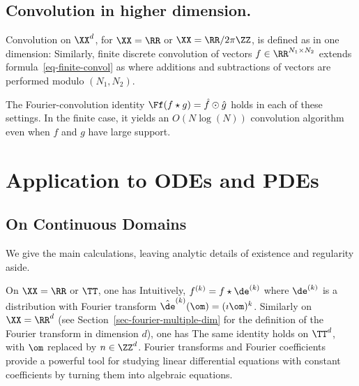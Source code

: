\subsection{Convolution in higher dimension.}

Convolution on $\XX^d$, for $\XX=\RR$ or $\XX=\RR/2\pi\ZZ$, is defined as in one dimension:
Similarly, finite discrete convolution of vectors $f \in \RR^{N_1 \times N_2}$ extends formula~\eqref{eq-finite-convol} as
where additions and subtractions of vectors are performed modulo $(N_1,N_2)$.

The Fourier-convolution identity $\Ff(f \star g)=\hat f \odot \hat g$ holds in each of these settings. In the finite case, it yields an $O(N \log(N))$ convolution algorithm even when $f$ and $g$ have large support.


\section{Application to ODEs and PDEs}
\label{sec-fourier-pdes}

\subsection{On Continuous Domains}

We give the main calculations, leaving analytic details of existence and regularity aside.

On $\XX=\RR$ or $\TT$, one has
Intuitively, $f^{(k)} = f \star \de^{(k)}$ where $\de^{(k)}$ is a distribution with Fourier transform $\hat \de^{(k)}(\om) = (\imath \om)^k$. 
%
Similarly on $\XX=\RR^d$ (see Section~\ref{sec-fourier-multiple-dim} for the definition of the Fourier transform in dimension $d$), one has
The same identity holds on $\TT^d$, with $\om$ replaced by $n \in \ZZ^d$.
%
Fourier transforms and Fourier coefficients provide a powerful tool for studying linear differential equations with constant coefficients by turning them into algebraic equations.

